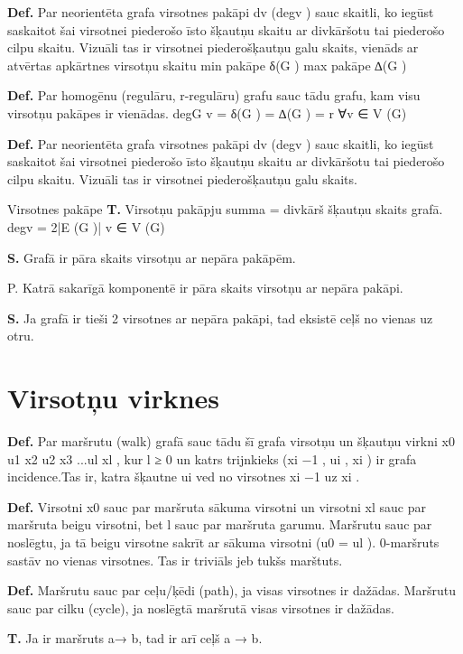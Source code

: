 \documentclass{article}
\begin{document}
\textbf{Def.}  Par neorientēta grafa virsotnes pakāpi dv (degv ) sauc skaitli, ko iegūst saskaitot šai virsotnei piederošo īsto šķautņu skaitu ar divkāršotu tai piederošo cilpu skaitu.  Vizuāli tas ir virsotnei piederošķautņu galu skaits, vienāds ar atvērtas apkārtnes virsotņu skaitu min pakāpe δ(G ) max pakāpe ∆(G )

\textbf{Def.} Par homogēnu (regulāru, r-regulāru) grafu sauc tādu grafu, kam visu virsotņu pakāpes ir vienādas.
degG v = δ(G ) = ∆(G ) = r ∀v ∈ V (G)

\textbf{Def.}  Par neorientēta grafa virsotnes pakāpi dv (degv ) sauc skaitli, ko iegūst saskaitot šai virsotnei piederošo īsto šķautņu skaitu ar divkāršotu tai piederošo cilpu skaitu. Vizuāli tas ir virsotnei piederošķautņu galu skaits.

Virsotnes pakāpe \textbf{T. }Virsotņu pakāpju summa = divkārš šķautņu skaits grafā.  degv = 2|E (G )| v ∈ V (G)

\textbf{S. } Grafā ir pāra skaits virsotņu ar nepāra pakāpēm.

P.  Katrā sakarīgā komponentē ir pāra skaits virsotņu ar nepāra pakāpi.

\textbf{S. } Ja grafā ir tieši 2 virsotnes ar nepāra pakāpi, tad eksistē ceļš no vienas uz
otru.

\section{Virsotņu virknes}

\textbf{Def.}  Par maršrutu (walk) grafā sauc tādu šī grafa virsotņu un šķautņu virkni x0 u1 x2 u2 x3 ...ul xl , kur l ≥ 0 un katrs trijnkieks (xi −1 , ui , xi ) ir grafa incidence.Tas ir, katra šķautne ui ved no virsotnes xi −1 uz xi .

\textbf{Def.}  Virsotni x0 sauc par maršruta sākuma virsotni un virsotni xl sauc par maršruta beigu virsotni, bet l sauc par maršruta garumu.  Maršrutu sauc par noslēgtu, ja tā beigu virsotne sakrīt ar sākuma virsotni (u0 = ul ).  0-maršruts sastāv no vienas virsotnes. Tas ir triviāls jeb tukšs marštuts.

\textbf{Def.}  Maršrutu sauc par ceļu/ķēdi (path), ja visas virsotnes ir dažādas.  Maršrutu sauc par cilku (cycle), ja noslēgtā maršrutā visas virsotnes ir dažādas.

\textbf{T.}  Ja ir maršruts a→ b, tad ir arī ceļš a → b.
\end{document}
